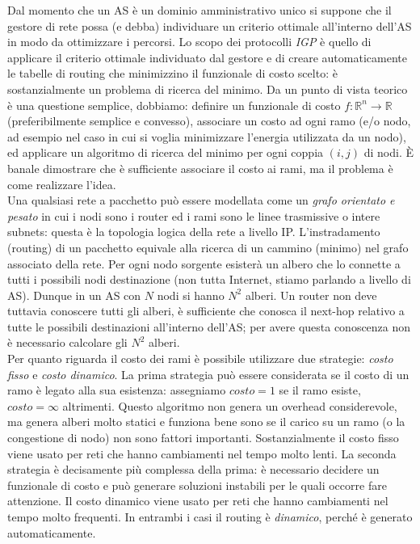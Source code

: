 Dal momento che un AS è un dominio amministrativo unico si suppone che il gestore di rete possa (e debba) individuare un criterio ottimale all'interno dell'AS in modo da ottimizzare i percorsi. Lo scopo dei protocolli \textit{IGP} è quello di applicare il criterio ottimale individuato dal gestore e di creare automaticamente le tabelle di routing che minimizzino il funzionale di costo scelto: è sostanzialmente un problema di ricerca del minimo. Da un punto di vista teorico è una questione semplice, dobbiamo: definire un funzionale di costo $f:\mathbb{R}^n\to\mathbb{R}$ (preferibilmente semplice e convesso), associare un costo ad ogni ramo (e/o nodo, ad esempio nel caso in cui si voglia minimizzare l'energia utilizzata da un nodo), ed applicare un algoritmo di ricerca del minimo per ogni coppia $(i,j)$ di nodi. È banale dimostrare che è sufficiente associare il costo ai rami, ma il problema è come realizzare l'idea.\\
Una qualsiasi rete a pacchetto può essere modellata come un \textit{grafo orientato e pesato} in cui i nodi sono i router ed i rami sono le linee trasmissive o intere subnets: questa è la topologia logica della rete a livello IP. L'instradamento (routing) di un pacchetto equivale alla ricerca di un cammino (minimo) nel grafo associato della rete. Per ogni nodo sorgente esisterà un albero che lo connette a tutti i possibili nodi destinazione (non tutta Internet, stiamo parlando a livello di AS). Dunque in un AS con $N$ nodi si hanno $N^2$ alberi. Un router non deve tuttavia conoscere tutti gli alberi, è sufficiente che conosca il next-hop relativo a tutte le possibili destinazioni all'interno dell'AS; per avere questa conoscenza non è necessario calcolare gli $N^2$ alberi.\\
Per quanto riguarda il costo dei rami è possibile utilizzare due strategie: \textit{costo fisso} e \textit{costo dinamico}. La prima strategia può essere considerata se il costo di un ramo è legato alla sua esistenza: assegniamo $costo = 1$ se il ramo esiste, $costo = \infty$ altrimenti. Questo algoritmo non genera un overhead considerevole, ma genera alberi molto statici e funziona bene sono se il carico su un ramo (o la congestione di nodo) non sono fattori importanti. Sostanzialmente il costo fisso viene usato per reti che hanno cambiamenti nel tempo molto lenti. La seconda strategia è decisamente più complessa della prima: è necessario decidere un funzionale di costo e può generare soluzioni instabili per le quali occorre fare attenzione. Il costo dinamico viene usato per reti che hanno cambiamenti nel tempo molto frequenti. In entrambi i casi il routing è \textit{dinamico}, perché è generato automaticamente.\\
